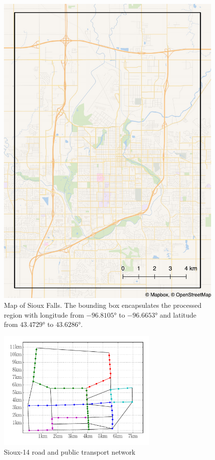 \begin{figure}
    \centering
    \includegraphics[width=1.0\textwidth]{figures/sioux_falls.pdf}
    \caption{Map of Sioux Falls. The bounding box encapsulates the
    processed region with longitude from $-96.8105°$ to $-96.6653°$ and latitude from $43.4729°$ to $43.6286°$.}
    \label{fig:original_map}
\end{figure}

\begin{figure}
    \centering
    \includegraphics[width=0.7\textwidth]{figures/sioux14_pt.pdf}
    \caption{Sioux-14 road and public transport network}
    \label{fig:sioux14}
\end{figure}

